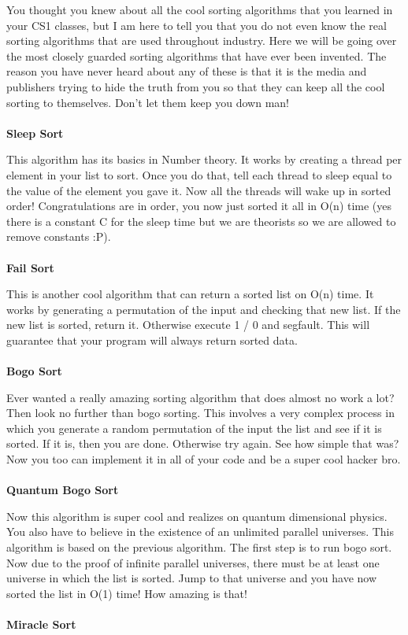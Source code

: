 \documentclass[9pt]{extarticle} %
\begin{document}
%
\begin{minipage}[t]{.61\linewidth} %
\vspace{-0.4cm}
\hypertarget{firstnews}{}

You thought you knew about all the cool sorting algorithms that you learned in your CS1 classes, but
I am here to tell you that you do not even know the real sorting algorithms that are used throughout
industry. Here we will be going over the most closely guarded sorting algorithms that have ever been
invented. The reason you have never heard about any of these is that it is the media and publishers
trying to hide the truth from you so that they can keep all the cool sorting to themselves. Don't
let them keep you down man!
\\
\\
\textbf{Sleep Sort}

This algorithm has its basics in Number theory. It works by creating a thread per element in your
list to sort. Once you do that, tell each thread to sleep equal to the value of the element you gave
it. Now all the threads will wake up in sorted order! Congratulations are in order, you now just
sorted it all in O(n) time (yes there is a constant C for the sleep time but we are theorists so we
are allowed to remove constants :P).
\\
\\
\textbf{Fail Sort}

This is another cool algorithm that can return a sorted list on O(n) time. It works by generating a
permutation of the input and checking that new list. If the new list is sorted, return it. Otherwise
execute 1 / 0 and segfault. This will guarantee that your program will always return sorted data.
\\
\\
\textbf{Bogo Sort}

Ever wanted a really amazing sorting algorithm that does almost no work a lot? Then look no further
than bogo sorting. This involves a very complex process in which you generate a random permutation
of the input the list and see if it is sorted. If it is, then you are done. Otherwise try again. See
how simple that was? Now you too can implement it in all of your code and be a super cool hacker
bro.
\\
\\
\textbf{Quantum Bogo Sort}

Now this algorithm is super cool and realizes on quantum dimensional physics. You also have to
believe in the existence of an unlimited parallel universes. This algorithm is based on the previous
algorithm. The first step is to run bogo sort. Now due to the proof of infinite parallel universes,
there must be at least one universe in which the list is sorted. Jump to that universe and you have
now sorted the list in O(1) time! How amazing is that!
\\
\\
\textbf{Miracle Sort}


\end{minipage}
\end{document}
